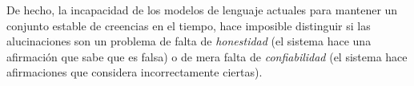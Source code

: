 De hecho, la incapacidad de los modelos de lenguaje actuales para mantener un conjunto estable de creencias en el tiempo, hace imposible distinguir si las alucinaciones son un problema de falta de   \textit{honestidad} (el sistema hace una afirmación que sabe que es falsa) o de mera falta de \textit{confiabilidad} (el sistema hace afirmaciones que considera incorrectamente ciertas).